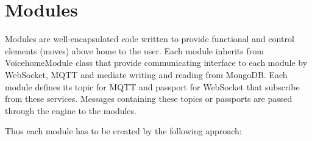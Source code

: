 \chapter{Modules} \label{chap:modules}


Modules are well-encapsulated code written to provide functional and control elements (moves) above home to the user. Each module inherits from VoicehomeModule class that provide communicating interface to each module by WebSocket, MQTT and mediate writing and reading from MongoDB. Each module defines its topic for MQTT and passport for WebSocket that subscribe from these services. Messages containing these topics or passports are passed through the engine to the modules.

Thus each module has to be created by the following approach:

